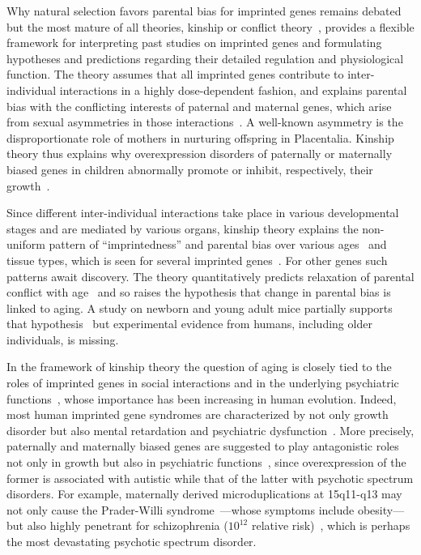 \documentclass[letterpaper]{article}
\begin{document}
Why natural selection favors parental bias for imprinted genes remains
debated~\cite{Wilkins2003,McDonald2005,Keverne2015} but the most mature of all
theories, kinship or conflict theory~\cite{Wilkins2003}, provides a flexible
framework for interpreting past studies on imprinted genes and formulating
hypotheses and predictions regarding their detailed regulation and
physiological function.  The theory assumes that all imprinted genes contribute to
inter-individual interactions in a highly dose-dependent fashion, and explains
parental bias with the conflicting interests of paternal and maternal genes,
which arise from sexual asymmetries in those interactions~\cite{Wilkins2003}.
A well-known asymmetry is the disproportionate role of mothers in
nurturing offspring in Placentalia.  Kinship theory thus explains why
overexpression disorders of paternally or maternally biased genes in children
abnormally promote or inhibit, respectively, their
growth~\cite{Plasschaert2014,Peters2014}.

Since different inter-individual interactions take place in various
developmental stages and are mediated by various organs, kinship theory
explains the non-uniform pattern of ``imprintedness'' and parental bias over
various ages~\cite{Bourke2007} and tissue types, which is seen for several
imprinted genes~\cite{Plasschaert2014,Peters2014}.  For other genes such
patterns await discovery.  The theory quantitatively predicts relaxation of
parental conflict with age~\cite{Ubeda2012} and so raises the hypothesis that
change in parental bias is linked to aging.  A study on newborn and young adult mice
partially supports that hypothesis~\cite{Perez2015} but experimental evidence
from humans, including older individuals, is missing.

In the framework of kinship theory the question of aging is closely tied to
the roles of imprinted genes in social interactions and in the underlying
psychiatric functions~\cite{Ubeda2012,Wilkins2003}, whose importance has been
increasing in human evolution.  Indeed, most human imprinted gene syndromes
are characterized by not only growth disorder but also mental retardation and
psychiatric dysfunction~\cite{Plasschaert2014,Peters2014}.  More precisely,
paternally and maternally biased genes are suggested to play antagonistic
roles not only in growth but also in psychiatric functions~\cite{Crespi2008a},
since overexpression of the former is associated with autistic while that of
the latter with psychotic spectrum disorders.  For example, maternally derived
microduplications at 15q11-q13 may not only cause the Prader-Willi
syndrome~\cite{Peters2014}---whose symptoms include obesity---but also highly
penetrant for schizophrenia (\(10^{12}\) relative
risk)~\cite{Ingason2011,Sullivan2012}, which is perhaps the most devastating
psychotic spectrum disorder.
\end{document}

